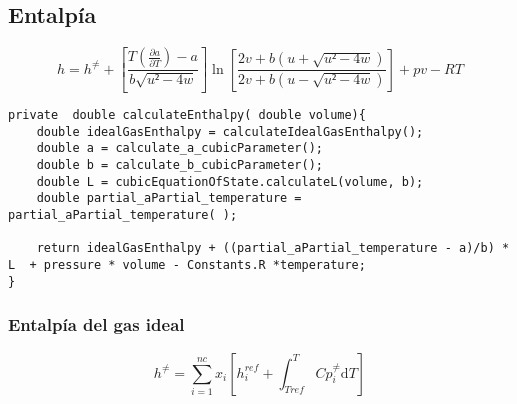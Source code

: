 \subsection{Entalpía}

\begin{equation}
h = h^{\neq} + \left[ \frac{T(\frac{\partial a}{\partial T}) - a}{b\sqrt{u²-4w} }\right] 
\ln\left[\frac{2v+b\left(u + \sqrt{u²-4w}\right)}{2v+b\left(u - \sqrt{u²-4w}\right)}\right]
+ pv - RT
\end{equation}

\begin{lstlisting}[label=some-code,caption=Some Code]
private  double calculateEnthalpy( double volume){
    double idealGasEnthalpy = calculateIdealGasEnthalpy();
    double a = calculate_a_cubicParameter();
    double b = calculate_b_cubicParameter();
    double L = cubicEquationOfState.calculateL(volume, b);
    double partial_aPartial_temperature = partial_aPartial_temperature( );
    
    return idealGasEnthalpy + ((partial_aPartial_temperature - a)/b) * L  + pressure * volume - Constants.R *temperature;
}
\end{lstlisting}	


\subsubsection{Entalpía del gas ideal}
\begin{equation}
h^{\neq} = \sum_{i=1}^{nc} x_i \left[ h_i^{ref} + \int_{Tref}^{T} Cp_i^{\neq} \mathrm{d}T \right]
\end{equation}





